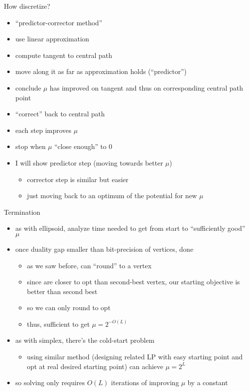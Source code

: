 \documentclass{article}
\begin{document}
How discretize?
\begin{itemize}
\item ``predictor-corrector method''
\item use linear approximation
\item compute tangent to central path
\item move along it as far as approximation holds (``predictor'')
\item conclude $\mu$ has improved on tangent and thus on corresponding
 central path point
\item ``correct'' back to central path 
\item each step improves $\mu$
\item stop when $\mu$ ``close enough'' to 0
\item I will show predictor step (moving towards better $\mu$)
\begin{itemize}
\item corrector step is similar but easier 
\item just moving back to an optimum of the potential for new $\mu$
\end{itemize}
\end{itemize}

Termination
\begin{itemize}
\item as with ellipsoid, analyze time needed to get from start to ``sufficiently good'' $\mu$
\item once duality gap smaller than bit-precision of vertices, done
\begin{itemize}
\item as we saw before, can ``round'' to a vertex
\item since are closer to opt than second-best vertex, our starting objective is better than second best
\item so we can only round to opt
\item thus, sufficient to get $\mu = 2^{-O(L)}$
\end{itemize}
\item as with simplex, there's the cold-start problem
\begin{itemize}
\item using similar method (designing related LP with easy starting point and opt at real desired starting point) can achieve $\mu=2^L$
\end{itemize}
\item so solving only requires $O(L)$ iterations of improving $\mu$ by a
 constant 
\end{itemize}
\end{document}
